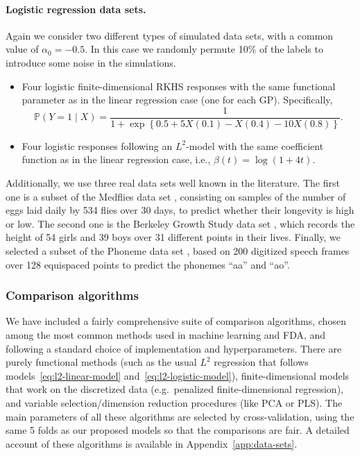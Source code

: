 \documentclass{article}
\numberwithin{equation}{section}
\theoremstyle{plain}
\begin{document}
\paragraph{Logistic regression data sets.} Again we consider two different types of simulated data sets,  with a common value of \(\alpha_0=-0.5\). In this case we randomly permute 10\% of the labels to introduce some noise in the simulations.
\begin{itemize}
  \item Four logistic finite-dimensional RKHS responses with the same functional parameter as in the linear regression case (one for each GP). Specifically,
        \[
          \mathbb P(Y=1\mid X) = \frac{1}{1 + \exp\left\{0.5 +5X(0.1) - X(0.4) - 10X(0.8)\right\}}.
        \]
  \item Four logistic responses following an \(L^2\)-model with the same coefficient function as in the linear regression case, i.e., \(\beta(t)=\log(1+4t)\).
\end{itemize}
Additionally, we use three real data sets well known in the literature. The first one is a subset of the Medflies data set \citep{carey1998relationship}, consisting on samples of the number of eggs laid daily by 534 flies over 30 days, to predict whether their longevity is high or low. The second one is the Berkeley Growth Study data set \citep{tuddenham1954physical}, which records the height of 54 girls and 39 boys over 31 different points in their lives. Finally, we selected a subset of the Phoneme data set \citep{hastie1995penalized}, based on 200 digitized speech frames over 128 equispaced points to predict the phonemes ``aa'' and ``ao''.

\subsubsection*{Comparison algorithms}

We have included a fairly comprehensive suite of comparison algorithms, chosen among the most common methods used in machine learning and FDA, and following a standard choice of implementation and hyperparameters. There are purely functional methods (such as the usual \(L^2\) regression that follows models~\eqref{eq:l2-linear-model} and~\eqref{eq:l2-logistic-model}), finite-dimensional models that work on the discretized data (e.g.\ penalized finite-dimensional regression), and variable selection/dimension reduction procedures (like PCA or PLS). The main parameters of all these algorithms are selected by cross-validation, using the same 5 folds as our proposed models so that the comparisons are fair. A detailed account of these algorithms is available in Appendix~\ref{app:data-sets}.
\end{document}
